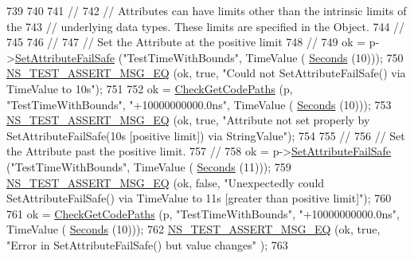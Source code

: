 \begin{DoxyCode}
739 
740   
741   \textcolor{comment}{//}
742   \textcolor{comment}{// Attributes can have limits other than the intrinsic limits of the}
743   \textcolor{comment}{// underlying data types.  These limits are specified in the Object.}
744   \textcolor{comment}{//}
745 
746   \textcolor{comment}{//}
747   \textcolor{comment}{// Set the Attribute at the positive limit}
748   \textcolor{comment}{//}
749   ok = p->\hyperlink{classns3_1_1ObjectBase_aa7d333004e970f925a4ed5df275541b5}{SetAttributeFailSafe} (\textcolor{stringliteral}{"TestTimeWithBounds"}, TimeValue (
      \hyperlink{group__timecivil_ga33c34b816f8ff6628e33d5c8e9713b9e}{Seconds} (10)));
750   \hyperlink{group__testing_ga2a9d78cffb3db8e867c35fff0b698cf5}{NS\_TEST\_ASSERT\_MSG\_EQ} (ok, \textcolor{keyword}{true}, \textcolor{stringliteral}{"Could not SetAttributeFailSafe() via TimeValue to
       10s"});
751 
752   ok = \hyperlink{classAttributeTestCase_a902fb84c803f1c898329f9263575331e}{CheckGetCodePaths} (p, \textcolor{stringliteral}{"TestTimeWithBounds"}, \textcolor{stringliteral}{"+10000000000.0ns"}, TimeValue (
      \hyperlink{group__timecivil_ga33c34b816f8ff6628e33d5c8e9713b9e}{Seconds} (10)));
753   \hyperlink{group__testing_ga2a9d78cffb3db8e867c35fff0b698cf5}{NS\_TEST\_ASSERT\_MSG\_EQ} (ok, \textcolor{keyword}{true}, \textcolor{stringliteral}{"Attribute not set properly by
       SetAttributeFailSafe(10s [positive limit]) via StringValue"});
754 
755   \textcolor{comment}{//}
756   \textcolor{comment}{// Set the Attribute past the positive limit.}
757   \textcolor{comment}{//}
758   ok = p->\hyperlink{classns3_1_1ObjectBase_aa7d333004e970f925a4ed5df275541b5}{SetAttributeFailSafe} (\textcolor{stringliteral}{"TestTimeWithBounds"}, TimeValue (
      \hyperlink{group__timecivil_ga33c34b816f8ff6628e33d5c8e9713b9e}{Seconds} (11)));
759   \hyperlink{group__testing_ga2a9d78cffb3db8e867c35fff0b698cf5}{NS\_TEST\_ASSERT\_MSG\_EQ} (ok, \textcolor{keyword}{false}, \textcolor{stringliteral}{"Unexpectedly could SetAttributeFailSafe() via
       TimeValue to 11s [greater than positive limit]"});
760 
761   ok = \hyperlink{classAttributeTestCase_a902fb84c803f1c898329f9263575331e}{CheckGetCodePaths} (p, \textcolor{stringliteral}{"TestTimeWithBounds"}, \textcolor{stringliteral}{"+10000000000.0ns"}, TimeValue (
      \hyperlink{group__timecivil_ga33c34b816f8ff6628e33d5c8e9713b9e}{Seconds} (10)));
762   \hyperlink{group__testing_ga2a9d78cffb3db8e867c35fff0b698cf5}{NS\_TEST\_ASSERT\_MSG\_EQ} (ok, \textcolor{keyword}{true}, \textcolor{stringliteral}{"Error in SetAttributeFailSafe() but value changes"}
      );
763 

\end{DoxyCode}
